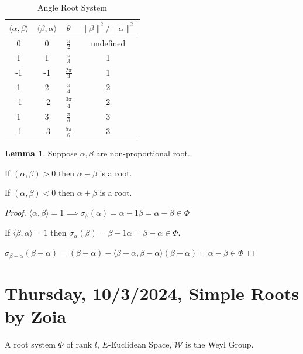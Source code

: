 \documentclass{article}
\theoremstyle{definition}
\newtheorem{lemma}[theorem]{Lemma}
\begin{document}
\begin{table}[H]
    \centering
    \begin{tabular}{c|c|c|c}
        \toprule
            \(\langle \alpha , \beta \rangle \) & \(\langle \beta , \alpha \rangle \)  & \(\theta\) &  \(\lVert \beta  \rVert ^2 / \lVert \alpha \rVert ^2\)  \\
        \midrule
            0 & 0 & \(\frac{\pi}{2}\) & undefined \\
            1 & 1 & \(\frac{\pi}{3}\) & 1  \\
            -1 & -1 & \(\frac{2\pi}{3}\) & 1 \\
            1 & 2 & \(\frac{\pi}{4}\) & 2 \\
            -1 & -2 & \(\frac{3\pi}{4}\) & 2  \\
            1 & 3 & \(\frac{\pi}{6}\)  & 3 \\
            -1 & -3 & \(\frac{5\pi}{6}\) & 3 \\
        \bottomrule
    \end{tabular}
    \caption{Angle Root System}
    \label{tab:rootsystable}
\end{table}

\begin{lemma}
    Suppose \(\alpha ,\beta \) are non-proportional root.
    
    If \((\alpha ,\beta) > 0\) then \(\alpha  - \beta \) is a root.

    If \((\alpha ,\beta ) < 0\) then \(\alpha + \beta \) is a root.

\end{lemma}

\begin{proof}
    \(\langle \alpha ,\beta  \rangle = 1 \implies \sigma_\beta (\alpha) = \alpha - 1\beta = \alpha - \beta  \in \Phi\) 

    If \(\langle \beta ,\alpha  \rangle = 1\) then \(\sigma_\alpha(\beta) = \beta - 1\alpha = \beta -\alpha \in \Phi\).
    
    \(\sigma_{\beta - \alpha}(\beta - \alpha) = (\beta - \alpha) - \langle \beta -\alpha , \beta -\alpha  \rangle (\beta -\alpha ) = \alpha - \beta \in \Phi\) 
\end{proof}

\section{Thursday, 10/3/2024, Simple Roots by Zoia}

A root system \(\Phi\) of rank \(l\), \(E\)-Euclidean Space, \(\mathcal{W}\) is the Weyl Group.
\end{document}
